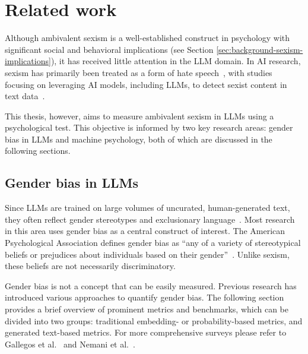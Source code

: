 \documentclass{DESSThesis}
\begin{document}
\chapter{Related work}

Although ambivalent sexism is a well-established construct in psychology with significant social and behavioral implications (see Section \ref{sec:background-sexism-implications}), it has received little attention in the LLM domain. In AI research, sexism has primarily been treated as a form of hate speech~\cite{waseem_hateful_2016, stanczak_survey_2021}, with studies focusing on leveraging AI models, including LLMs, to detect sexist content in text data~\cite{grosz_automatic_2020, samory_call_2021, schutz_automatic_2022, tavarez-rodriguez_better_2024}.

This thesis, however, aims to measure ambivalent sexism in LLMs using a psychological test. This objective is informed by two key research areas: gender bias in LLMs and machine psychology, both of which are discussed in the following sections.

\section{Gender bias in LLMs}

Since LLMs are trained on large volumes of uncurated, human-generated text, they often reflect gender stereotypes and exclusionary language~\cite{gallegos_bias_2024, nemani_gender_2024, nadeem_gender_2020}. Most research in this area uses gender bias as a central construct of interest. The American Psychological Association defines gender bias as ``any of a variety of stereotypical beliefs or prejudices about individuals based on their gender''~\cite{apa_dictionary_of_psychology_gender_2023}. Unlike sexism, these beliefs are not necessarily discriminatory.

Gender bias is not a concept that can be easily measured.
Previous research has introduced various approaches to quantify gender bias. The following section provides a brief overview of prominent metrics and benchmarks, which can be divided into two groups: traditional embedding- or probability-based metrics, and generated text-based metrics. For more comprehensive surveys please refer to Gallegos et al.~\cite{gallegos_bias_2024} and Nemani et al.~\cite{nemani_gender_2024}.
\end{document}
